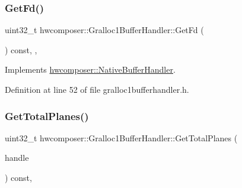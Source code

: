 \begin{DoxyCode}{0}
\end{DoxyCode}
\mbox{\label{classhwcomposer_1_1Gralloc1BufferHandler_aee03106dfff3a4b68b2a29a0d0350d07}} 
\subsubsection{\texorpdfstring{Get\+Fd()}{GetFd()}}
{\footnotesize\ttfamily uint32\+\_\+t hwcomposer\+::\+Gralloc1\+Buffer\+Handler\+::\+Get\+Fd (\begin{DoxyParamCaption}{ }\end{DoxyParamCaption}) const\hspace{0.3cm}{\ttfamily [inline]}, {\ttfamily [override]}, {\ttfamily [virtual]}}



Implements \mbox{\hyperlink{classhwcomposer_1_1NativeBufferHandler_adb5a4c6d14c012f8a5c71fbb2c984438}{hwcomposer\+::\+Native\+Buffer\+Handler}}.



Definition at line 52 of file gralloc1bufferhandler.\+h.


\begin{DoxyCode}{0}
\end{DoxyCode}
\mbox{\label{classhwcomposer_1_1Gralloc1BufferHandler_ad86921fa69dbb60b82581bd6f893decc}} 
\subsubsection{\texorpdfstring{Get\+Total\+Planes()}{GetTotalPlanes()}}
{\footnotesize\ttfamily uint32\+\_\+t hwcomposer\+::\+Gralloc1\+Buffer\+Handler\+::\+Get\+Total\+Planes (\begin{DoxyParamCaption}\item[{\mbox{\hyperlink{alios_2platformdefines_8h_ac0a2eaf260f556d17fe489911f017bdf}{H\+W\+C\+Native\+Handle}}}]{handle }\end{DoxyParamCaption}) const\hspace{0.3cm}{\ttfamily [override]}, {\ttfamily [virtual]}}



